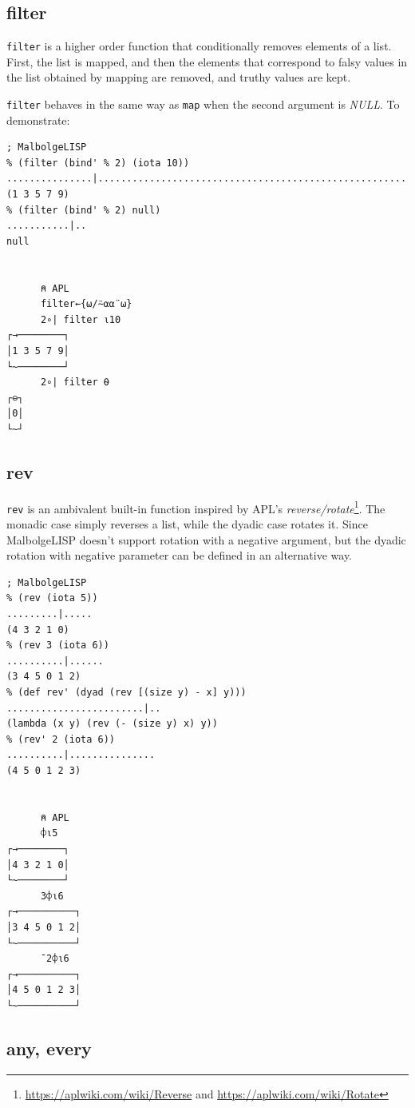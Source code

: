 \subsection{filter}

\par \verb|filter| is a higher order function that conditionally removes elements of a list. First, the list is mapped, and then the elements that correspond to falsy values in the list obtained by mapping are removed, and truthy values are kept. \par \verb|filter| behaves in the same way as \verb|map| when the second argument is \textit{NULL}. To demonstrate:

\begin{verbatim}
; MalbolgeLISP
% (filter (bind' % 2) (iota 10))
...............|......................................................
(1 3 5 7 9)
% (filter (bind' % 2) null)
...........|..
null


      ⍝ APL
      filter←{⍵/⍨⍺⍺¨⍵}
      2∘| filter ⍳10
┌→────────┐
│1 3 5 7 9│
└~────────┘
      2∘| filter ⍬
┌⊖┐
│0│
└~┘
\end{verbatim}

\subsection{rev}

\par \verb|rev| is an ambivalent built-in function inspired by APL's \textit{reverse/rotate}\footnote{\url{https://aplwiki.com/wiki/Reverse} and \url{https://aplwiki.com/wiki/Rotate}}. The monadic case simply reverses a list, while the dyadic case rotates it. Since MalbolgeLISP doesn't support rotation with a negative argument, but the dyadic rotation with negative parameter can be defined in an alternative way.

\begin{verbatim}
; MalbolgeLISP
% (rev (iota 5))
.........|.....
(4 3 2 1 0)
% (rev 3 (iota 6))
..........|......
(3 4 5 0 1 2)
% (def rev' (dyad (rev [(size y) - x] y)))
........................|..
(lambda (x y) (rev (- (size y) x) y))
% (rev' 2 (iota 6))
..........|...............
(4 5 0 1 2 3)


      ⍝ APL
      ⌽⍳5
┌→────────┐
│4 3 2 1 0│
└~────────┘
      3⌽⍳6
┌→──────────┐
│3 4 5 0 1 2│
└~──────────┘
      ¯2⌽⍳6
┌→──────────┐
│4 5 0 1 2 3│
└~──────────┘
\end{verbatim}

\subsection{any, every}

